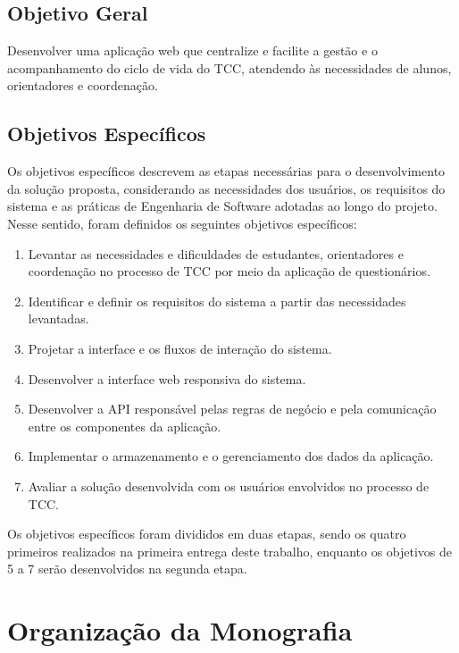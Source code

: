 \subsection{Objetivo Geral}

Desenvolver uma aplicação web que centralize e facilite a gestão e o acompanhamento do ciclo de vida do TCC, atendendo às necessidades de alunos, orientadores e coordenação.

\subsection{Objetivos Específicos}

Os objetivos específicos descrevem as etapas necessárias para o desenvolvimento da solução proposta, considerando as necessidades dos usuários, os requisitos do sistema e as práticas de Engenharia de Software adotadas ao longo do projeto. Nesse sentido, foram definidos os seguintes objetivos específicos:

\begin{enumerate}
    \item Levantar as necessidades e dificuldades de estudantes, orientadores e coordenação no processo de TCC por meio da aplicação de questionários.
    \item Identificar e definir os requisitos do sistema a partir das necessidades levantadas.
    \item Projetar a interface e os fluxos de interação do sistema.
    \item Desenvolver a interface web responsiva do sistema.
    \item Desenvolver a API responsável pelas regras de negócio e pela comunicação entre os componentes da aplicação.
    \item Implementar o armazenamento e o gerenciamento dos dados da aplicação.
    \item Avaliar a solução desenvolvida com os usuários envolvidos no processo de TCC.
\end{enumerate}

Os objetivos específicos foram divididos em duas etapas, sendo os quatro primeiros realizados na primeira entrega deste trabalho, enquanto os objetivos de 5 a 7 serão desenvolvidos na segunda etapa.


\section{Organização da Monografia}



